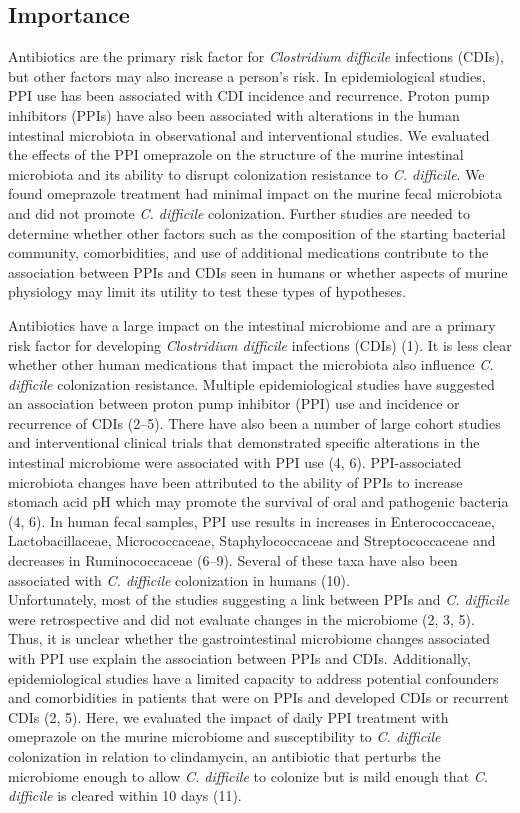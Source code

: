 \documentclass[11pt,]{article}
\begin{document}
\subsection{Importance}\label{importance}

Antibiotics are the primary risk factor for \emph{Clostridium difficile}
infections (CDIs), but other factors may also increase a person's risk.
In epidemiological studies, PPI use has been associated with CDI
incidence and recurrence. Proton pump inhibitors (PPIs) have also been
associated with alterations in the human intestinal microbiota in
observational and interventional studies. We evaluated the effects of
the PPI omeprazole on the structure of the murine intestinal microbiota
and its ability to disrupt colonization resistance to \emph{C.
difficile}. We found omeprazole treatment had minimal impact on the
murine fecal microbiota and did not promote \emph{C. difficile}
colonization. Further studies are needed to determine whether other
factors such as the composition of the starting bacterial community,
comorbidities, and use of additional medications contribute to the
association between PPIs and CDIs seen in humans or whether aspects of
murine physiology may limit its utility to test these types of
hypotheses.

\newpage

Antibiotics have a large impact on the intestinal microbiome and are a
primary risk factor for developing \emph{Clostridium difficile}
infections (CDIs) (1). It is less clear whether other human medications
that impact the microbiota also influence \emph{C. difficile}
colonization resistance. Multiple epidemiological studies have suggested
an association between proton pump inhibitor (PPI) use and incidence or
recurrence of CDIs (2--5). There have also been a number of large cohort
studies and interventional clinical trials that demonstrated specific
alterations in the intestinal microbiome were associated with PPI use
(4, 6). PPI-associated microbiota changes have been attributed to the
ability of PPIs to increase stomach acid pH which may promote the
survival of oral and pathogenic bacteria (4, 6). In human fecal samples,
PPI use results in increases in Enterococcaceae, Lactobacillaceae,
Micrococcaceae, Staphylococcaceae and Streptococcaceae and decreases in
Ruminococcaceae (6--9). Several of these taxa have also been associated
with \emph{C. difficile} colonization in humans (10).\\
Unfortunately, most of the studies suggesting a link between PPIs and
\emph{C. difficile} were retrospective and did not evaluate changes in
the microbiome (2, 3, 5). Thus, it is unclear whether the
gastrointestinal microbiome changes associated with PPI use explain the
association between PPIs and CDIs. Additionally, epidemiological studies
have a limited capacity to address potential confounders and
comorbidities in patients that were on PPIs and developed CDIs or
recurrent CDIs (2, 5). Here, we evaluated the impact of daily PPI
treatment with omeprazole on the murine microbiome and susceptibility to
\emph{C. difficile} colonization in relation to clindamycin, an
antibiotic that perturbs the microbiome enough to allow \emph{C.
difficile} to colonize but is mild enough that \emph{C. difficile} is
cleared within 10 days (11).
\end{document}

